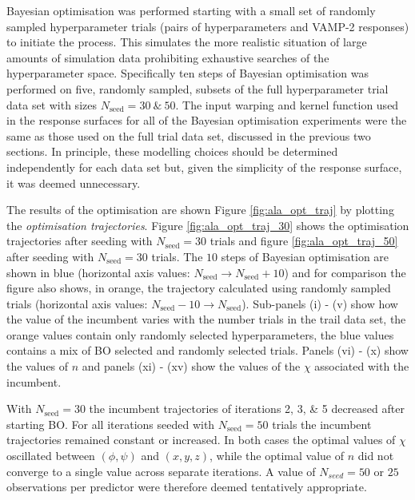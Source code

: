 Bayesian optimisation was performed starting with a small set of randomly sampled hyperparameter trials (pairs of hyperparameters and VAMP-2 responses) to initiate the process.  This simulates the more realistic situation of large amounts of simulation data prohibiting exhaustive searches of the hyperparameter space. Specifically ten steps of Bayesian optimisation was performed on five, randomly sampled, subsets of the full hyperparameter trial data set with sizes $N_{\mathrm{seed}}=30\ \&\ 50$. The input warping  and kernel function used in the response surfaces for all of the Bayesian optimisation experiments were the same as those used on the full trial data set, discussed in the previous two sections.  In principle, these modelling choices should be determined independently for each data set but, given the simplicity of the response surface, it was deemed unnecessary. 

The results of the optimisation are shown Figure \ref{fig:ala_opt_traj} by plotting the \emph{optimisation trajectories}. Figure \ref{fig:ala_opt_traj_30} shows the optimisation trajectories after seeding with $N_{\mathrm{seed}}=30$ trials and figure \ref{fig:ala_opt_traj_50} after seeding with $N_{\mathrm{seed}}=30$ trials. The $10$ steps of Bayesian optimisation are shown in blue (horizontal axis values: $N_{\mathrm{seed}} \rightarrow N_{\mathrm{seed}}+10$) and for comparison the figure also shows, in orange, the trajectory calculated using randomly sampled trials  (horizontal axis values: $N_{\mathrm{seed}}-10 \rightarrow N_{\mathrm{seed}}$). Sub-panels (i) -  (v) show how the value of the incumbent varies with the number trials in the trail data set, the orange values contain only randomly selected hyperparameters, the blue values contains a mix of BO selected and randomly selected trials. Panels (vi) - (x) show the values of $n$ and panels (xi) - (xv) show the values of the $\chi$ associated with the incumbent. 

With $N_{\mathrm{seed}}=30$ the incumbent trajectories of iterations 2, 3, \& 5 decreased after starting BO. For all iterations seeded with $N_{\mathrm{seed}}=50$ trials the incumbent trajectories remained constant or increased. In both cases the optimal values of $\chi$ oscillated between $(\phi, \psi)$ and $(x, y, z)$, while the optimal value of $n$ did not converge to a single value across separate iterations. A value of  $N_{seed} = 50$ or $25$ observations per predictor were therefore deemed tentatively appropriate. 

